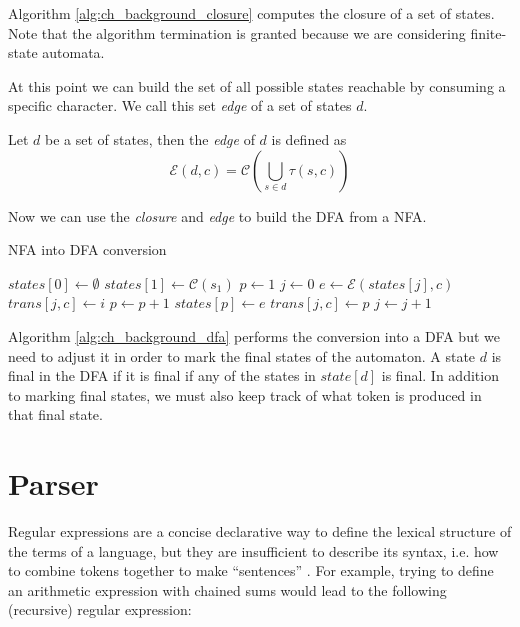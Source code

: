 Algorithm \ref{alg:ch_background_closure} computes the closure of a set of states. Note that the algorithm termination is granted because we are considering finite-state automata.

At this point we can build the set of all possible states reachable by consuming a specific character. We call this set \textit{edge} of a set of states $d$. 

\begin{definition}
	Let $d$ be a set of states, then the \textit{edge} of $d$ is defined as
	\begin{equation*}
		\mathcal{E}(d,c) = \mathcal{C}\left(\bigcup_{s \in d}\tau(s,c)\right)
	\end{equation*}
\end{definition}

\noindent
Now we can use the \textit{closure} and \textit{edge} to build the DFA from a NFA.

\begin{algorithm}
	\caption{NFA into DFA conversion}
	\label{alg:ch_background_dfa}
	\begin{algorithmic}
		\State $states[0] \gets \emptyset$
		\State $states[1] \gets \mathcal{C}(s_{1})$
		\State $p \gets 1$
		\State $j \gets 0$
				\State $e \gets \mathcal{E}(states[j],c)$
					\State $trans[j,c] \gets i$
				\Else
					\State $p \gets p + 1$
					\State $states[p] \gets e$
					\State $trans[j,c] \gets p$
				\EndIf
			\EndFor
			\State $j \gets j + 1$
		\EndWhile
	\end{algorithmic}
\end{algorithm}

\noindent
Algorithm \ref{alg:ch_background_dfa} performs the conversion into a DFA but we need to adjust it in order to mark the final states of the automaton. A state $d$ is final in the DFA if it is final if any of the states in $state[d]$ is final. In addition to marking final states, we must also keep track of what token is produced in that final state.

\section{Parser}
\label{sec:ch_background_parser}
Regular expressions are a concise declarative way to define the lexical structure of the terms of a language, but they are insufficient to describe its syntax, i.e. how to combine tokens together to  make ``sentences'' \cite{appel2002javacompiler, aho2007compilers}. For example, trying to define an arithmetic expression with chained sums would lead to the following (recursive) regular expression:

